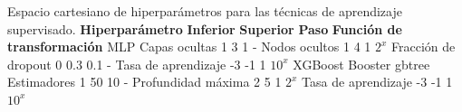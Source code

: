 \documentclass[letterpaper,12pt, twoside]{report}
\providecommand{\DIFdeltex}[1]{{\protect\color{red} \scriptsize #1}} %
\providecommand{\DIFdelFL}[1]{\DIFdel{#1}} %
\providecommand{\DIFdel}[1]{\texorpdfstring{\DIFdeltex{#1}}{}} %
\begin{document}
{%
\DIFdelFL{Espacio cartesiano de hiperparámetros para las técnicas de aprendizaje supervisado.}}
\DIFdelFL{\textbf{Hiperparámetro} }%
\DIFdelFL{\textbf{Inferior} }%
\DIFdelFL{\textbf{Superior} }%
\DIFdelFL{\textbf{Paso} }%
\DIFdelFL{\textbf{Función de transformación} }%
\DIFdelFL{MLP}%
\DIFdelFL{Capas ocultas        }%
\DIFdelFL{1    }%
\DIFdelFL{3     }%
\DIFdelFL{1   }%
\DIFdelFL{- }%
\DIFdelFL{Nodos ocultos        }%
\DIFdelFL{1    }%
\DIFdelFL{4     }%
\DIFdelFL{1   }%
\DIFdelFL{$2^{x}$ }%
\DIFdelFL{Fracción de dropout  }%
\DIFdelFL{0    }%
\DIFdelFL{0.3   }%
\DIFdelFL{0.1 }%
\DIFdelFL{- }%
\DIFdelFL{Tasa de aprendizaje  }%
\DIFdelFL{-3   }%
\DIFdelFL{-1    }%
\DIFdelFL{1   }%
\DIFdelFL{$10^{x}$ }%
\DIFdelFL{XGBoost}%
\DIFdelFL{Booster               }%
\DIFdelFL{gbtree }%
\DIFdelFL{Estimadores          }%
\DIFdelFL{1    }%
\DIFdelFL{50    }%
\DIFdelFL{10  }%
\DIFdelFL{- }%
\DIFdelFL{Profundidad máxima   }%
\DIFdelFL{2    }%
\DIFdelFL{5     }%
\DIFdelFL{1   }%
\DIFdelFL{$2^{x}$ }%
\DIFdelFL{Tasa de aprendizaje  }%
\DIFdelFL{-3   }%
\DIFdelFL{-1    }%
\DIFdelFL{1   }%
\DIFdelFL{$10^{x}$ }%
\end{document}
